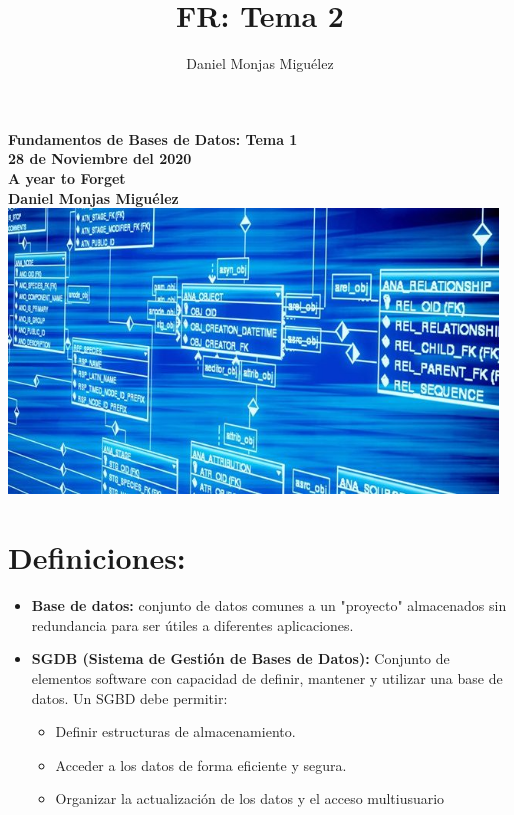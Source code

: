 \documentclass[a4paper,11pt]{article}
\author{Daniel Monjas Miguélez}
\title{FR: Tema 2}
\begin{document}
\begin{titlepage}
\centering
    \vfill
    {\bfseries\Large
        Fundamentos de Bases de Datos: Tema 1\\
        28 de Noviembre del 2020\\
        A year to Forget \\
        \vskip2cm
        Daniel Monjas Miguélez\\
    }    
    \vfill
    \includegraphics[width=13cm]{bases_datos.jpg}
    \vfill
    \vfill
\end{titlepage}

\newpage
\tableofcontents
\newpage

\section{Definiciones:}
\begin{itemize}
\item \textbf{Base de datos:} conjunto de datos comunes a un "proyecto" almacenados sin redundancia para ser útiles a diferentes aplicaciones.

\item \textbf{SGDB (Sistema de Gestión de Bases de Datos):} Conjunto de elementos software con capacidad de definir, mantener y utilizar una base de datos. Un SGBD debe permitir:
	\begin{itemize}
		\item Definir estructuras de almacenamiento.
		\item Acceder a los datos de forma eficiente y segura.
		\item Organizar la actualización de los datos y el acceso multiusuario
	\end{itemize}
\end{itemize}
\end{document}
